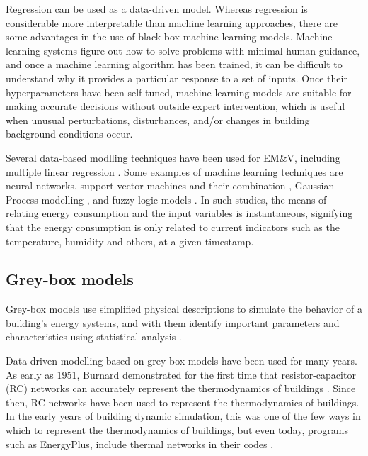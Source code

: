 \documentclass[10pt, conference, compsocconf]{IEEEtran}
\begin{document}
Regression can be used as a data-driven model. Whereas regression is considerable more interpretable than machine learning approaches, there are some advantages in the use of black-box machine learning models. 
Machine learning systems figure out how to solve problems with minimal human guidance, and once a machine learning algorithm has been trained, it can be difficult to understand why it provides a particular response to a set of inputs. 
Once their hyperparameters have been self-tuned, machine learning models are suitable for making accurate decisions without outside expert intervention, which is useful when unusual perturbations, disturbances, and/or changes in building background conditions occur. 

Several data-based modlling techniques have been used for EM\&V, including multiple linear regression \cite{braun2014using}.  %
Some examples of machine learning techniques are neural networks, support vector machines and their combination \cite{ahmad2014review}, Gaussian Process modelling \cite{heo2012gaussian}, and fuzzy logic models \cite{ciabattoni2014fuzzy}. In such studies, the means of relating energy consumption and the input variables is instantaneous, signifying that the energy consumption is only related to current indicators such as the temperature, humidity and others, at a given timestamp.
  

\subsection{Grey-box models}

Grey-box models use simplified physical descriptions to simulate the behavior of a building's energy systems, and with them identify important parameters and characteristics using statistical analysis \cite{handbook2017american}.

Data-driven modelling based on grey-box models have been used for many years. As early as 1951, Burnard demonstrated for the first time that resistor-capacitor (RC) networks can accurately represent the thermodynamics of buildings \cite{burnand1952study}. Since then, RC-networks have been used to represent the thermodynamics of buildings. In the early years of building dynamic simulation, this was one of the few ways in which to represent the thermodynamics of buildings, but even today, programs such as EnergyPlus, include thermal networks in their codes \cite{handbook2017american} .
\end{document}
